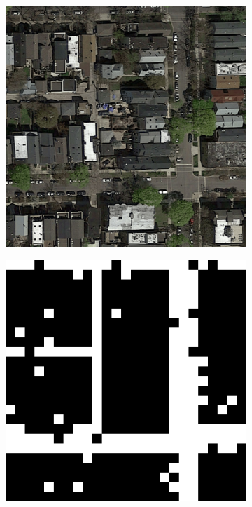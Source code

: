 \documentclass[10pt,conference,compsocconf]{IEEEtran}
\begin{document}
\begin{figure}[ht]
    \vspace{0.5cm}
    
    \begin{subfigure}{0.20\textwidth}
        \centering
        \includegraphics[width=0.9\linewidth]{doc/images/perfect_input.png}
    \end{subfigure}
    \begin{subfigure}{0.20\linewidth}
        \centering
        \includegraphics[width=0.9\linewidth]{doc/images/perfect_cnn.png}

\end{subfigure}
\end{figure}
\end{document}
